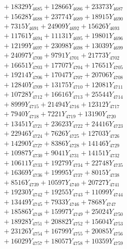 \documentclass[a4paper,10pt]{article}
\begin{document}
{\begin{align}
&\;  + 18329 Y_{4685} + 12866 Y_{4686} + 23373 Y_{4687} \\[0.3ex]
&\;  + 15628 Y_{4688} + 23774 Y_{4689} + 18915 Y_{4690} \\[0.3ex]
&\;  + 7315 Y_{4691} + 24909 Y_{4692} + 15626 Y_{4693} \\[0.3ex]
&\;  + 11761 Y_{4694} + 11131 Y_{4695} + 19801 Y_{4696} \\[0.3ex]
&\;  + 12199 Y_{4697} + 23098 Y_{4698} + 13039 Y_{4699} \\[0.3ex]
&\;  + 24097 Y_{4700} + 9791 Y_{4701} + 21773 Y_{4702} \\[0.3ex]
&\;  + 16651 Y_{4703} + 17707 Y_{4704} + 17651 Y_{4705} \\[0.3ex]
&\;  + 19214 Y_{4706} + 17047 Y_{4707} + 20706 Y_{4708} \\[0.5ex]\allowbreak
&\;  + 12840 Y_{4709} + 13175 Y_{4710} + 12081 Y_{4711} \\[0.3ex]
&\;  + 10728 Y_{4712} + 16616 Y_{4713} + 25544 Y_{4714} \\[0.3ex]
&\;  + 8999 Y_{4715} + 21494 Y_{4716} + 12312 Y_{4717} \\[0.3ex]
&\;  + 7940 Y_{4718} + 7221 Y_{4719} + 13190 Y_{4720} \\[0.3ex]
&\;  + 13451 Y_{4721} + 23623 Y_{4722} + 24416 Y_{4723} \\[0.3ex]
&\;  + 22946 Y_{4724} + 7626 Y_{4725} + 12703 Y_{4726} \\[0.3ex]
&\;  + 14290 Y_{4727} + 8386 Y_{4728} + 14146 Y_{4729} \\[0.3ex]
&\;  + 10987 Y_{4730} + 9041 Y_{4731} + 14151 Y_{4732} \\[0.3ex]
&\;  + 10611 Y_{4733} + 19279 Y_{4734} + 22748 Y_{4735} \\[0.3ex]
&\;  + 16369 Y_{4736} + 19995 Y_{4737} + 8015 Y_{4738} \\[0.5ex]\allowbreak
&\;  + 8516 Y_{4739} + 10597 Y_{4740} + 20727 Y_{4741} \\[0.3ex]
&\;  + 19230 Y_{4742} + 19255 Y_{4743} + 11099 Y_{4744} \\[0.3ex]
&\;  + 13449 Y_{4745} + 7933 Y_{4746} + 7868 Y_{4747} \\[0.3ex]
&\;  + 18586 Y_{4748} + 15997 Y_{4749} + 25024 Y_{4750} \\[0.3ex]
&\;  + 18928 Y_{4751} + 20882 Y_{4752} + 15604 Y_{4753} \\[0.3ex]
&\;  + 23126 Y_{4754} + 16799 Y_{4755} + 20085 Y_{4756} \\[0.3ex]
&\;  + 16029 Y_{4757} + 18057 Y_{4758} + 10359 Y_{4759} \\[0.3ex]

\end{align}}
\end{document}
